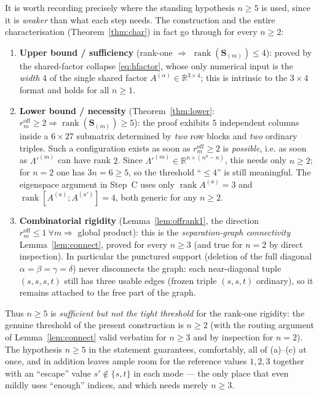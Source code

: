 \begin{remark}\label{rem:threshold}
It is worth recording precisely where the standing hypothesis $n\ge5$ is used, since it is
\emph{weaker} than what each step needs. The construction and the entire characterisation
(Theorem~\ref{thm:char}) in fact go through for every $n\ge2$:
\begin{enumerate}
\item[(a)] \textbf{Upper bound / sufficiency} (rank-one $\Rightarrow$
$\operatorname{rank}(\mathbf S_{(m)})\le4$): proved by the shared-factor collapse
\eqref{eq:hfactor}, whose only numerical input is the \emph{width} $4$ of the single shared
factor $A^{(\alpha)}\in\mathbb R^{3\times4}$; this is intrinsic to the $3\times4$ format and
holds for all $n\ge1$.
\item[(b)] \textbf{Lower bound / necessity} (Theorem~\ref{thm:lower}: $r_m^{\mathrm{off}}\ge2
\Rightarrow\operatorname{rank}(\mathbf S_{(m)})\ge5$): the proof exhibits $5$ independent
columns inside a $6\times27$ submatrix determined by \emph{two} row blocks and \emph{two}
ordinary triples. Such a configuration exists as soon as $r_m^{\mathrm{off}}\ge2$ is
\emph{possible}, i.e. as soon as $\Lambda'^{(m)}$ can have rank $2$. Since
$\Lambda'^{(m)}\in\mathbb R^{n\times(n^3-n)}$, this needs only $n\ge2$; for $n=2$ one has
$3n=6\ge5$, so the threshold ``$\le4$'' is still meaningful. The eigenspace argument in
Step~C uses only $\operatorname{rank}A^{(a)}=3$ and $\operatorname{rank}[A^{(a)};A^{(a')}]=4$,
both generic for any $n\ge2$.
\item[(c)] \textbf{Combinatorial rigidity} (Lemma~\ref{lem:offrank1}, the direction
$r_m^{\mathrm{off}}\le1\ \forall m\Rightarrow$ global product): this is the
\emph{separation-graph connectivity} Lemma~\ref{lem:connect}, proved for every $n\ge3$
(and true for $n=2$ by direct inspection). In particular the punctured support (deletion of
the full diagonal $\alpha=\beta=\gamma=\delta$) never disconnects the graph: each
near-diagonal tuple $(s,s,s,t)$ still has three usable edges (frozen triple $(s,s,t)$
ordinary), so it remains attached to the free part of the graph.
\end{enumerate}
Thus $n\ge5$ is \emph{sufficient but not the tight threshold} for the rank-one rigidity:
the genuine threshold of the present construction is $n\ge2$ (with the routing argument of
Lemma~\ref{lem:connect} valid verbatim for $n\ge3$ and by inspection for $n=2$). The
hypothesis $n\ge5$ in the statement guarantees, comfortably, all of (a)--(c) at once, and in
addition leaves ample room for the reference values $1,2,3$ together with an ``escape''
value $s'\notin\{s,t\}$ in each mode --- the only place that even mildly uses ``enough''
indices, and which needs merely $n\ge3$.


\end{remark}
